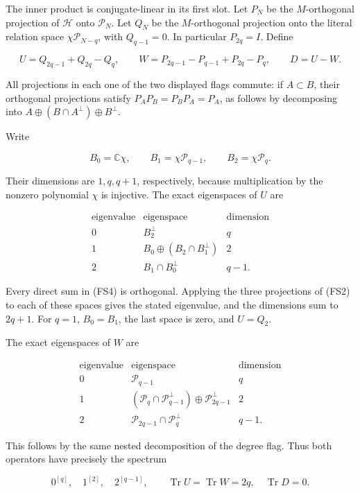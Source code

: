 \documentclass{article}
\begin{document}
The inner product is conjugate-linear in its first slot. Let \(P_N\) be the \(M\)-orthogonal projection of \(\mathcal H\) onto \(\mathcal P_N\). Let \(Q_N\) be the \(M\)-orthogonal projection onto the literal relation space \(\chi\mathcal P_{N-q}\), with \(Q_{q-1}=0\). In particular \(P_{2q}=I\). Define

\[
U=Q_{2q-1}+Q_{2q}-Q_q,
\qquad
W=P_{2q-1}-P_{q-1}+P_{2q}-P_q,
\qquad D=U-W.
\tag{FS2}
\]

All projections in each one of the two displayed flags commute: if \(A\subset B\), their orthogonal projections satisfy \(P_AP_B=P_BP_A=P_A\), as follows by decomposing into \(A\oplus(B\cap A^\perp)\oplus B^\perp\).

Write

\[
B_0=\mathbb C\chi,\qquad
B_1=\chi\mathcal P_{q-1},\qquad
B_2=\chi\mathcal P_q.
\tag{FS3}
\]

Their dimensions are \(1,q,q+1\), respectively, because multiplication by the nonzero polynomial \(\chi\) is injective. The exact eigenspaces of \(U\) are

\[
\begin{array}{c|c|c}
\text{eigenvalue}&\text{eigenspace}&\text{dimension}\\\hline
0&B_2^\perp&q\\
1&B_0\oplus(B_2\cap B_1^\perp)&2\\
2&B_1\cap B_0^\perp&q-1.
\end{array}
\tag{FS4}
\]

Every direct sum in (FS4) is orthogonal. Applying the three projections of (FS2) to each of these spaces gives the stated eigenvalue, and the dimensions sum to \(2q+1\). For \(q=1\), \(B_0=B_1\), the last space is zero, and \(U=Q_2\).

The exact eigenspaces of \(W\) are

\[
\begin{array}{c|c|c}
\text{eigenvalue}&\text{eigenspace}&\text{dimension}\\\hline
0&\mathcal P_{q-1}&q\\
1&(\mathcal P_q\cap\mathcal P_{q-1}^\perp)\oplus\mathcal P_{2q-1}^\perp&2\\
2&\mathcal P_{2q-1}\cap\mathcal P_q^\perp&q-1.
\end{array}
\tag{FS5}
\]

This follows by the same nested decomposition of the degree flag. Thus both operators have precisely the spectrum

\[
0^{[q]},\quad1^{[2]},\quad2^{[q-1]},
\qquad \operatorname{Tr}U=\operatorname{Tr}W=2q,
\quad \operatorname{Tr}D=0.
\tag{FS6}
\]
\end{document}
